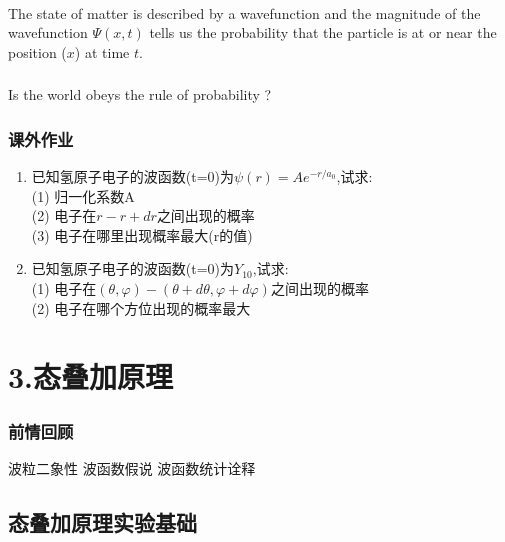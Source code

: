 \begin{frame}  
    \begin{tcolorbox3}[Conclusion]
        ~~\\
       {The state of matter is described by a wavefunction and the magnitude of the wavefunction $ \Psi(x,t)$ 
       tells us the probability that the particle is at or near the position ($x$) at time $t$.}
    \end{tcolorbox3} 
\end{frame} 

\begin{frame}
    \frametitle{}
    \centering
    {
    {Is the world obeys the rule of probability ?}
    }
\end{frame}
 \begin{frame}
     \frametitle{课外作业}
     \begin{enumerate}
        \item 已知氢原子电子的波函数(t=0)为$\psi(r)=Ae^{-r/a_0} $,试求:\\
               (1) 归一化系数A \\
               (2) 电子在$r-r+dr$之间出现的概率\\
               (3) 电子在哪里出现概率最大(r的值) 
        \item 已知氢原子电子的波函数(t=0)为$ Y_{10} $,试求:\\
                (1) 电子在$(\theta, \varphi) -(\theta + d \theta, \varphi + d \varphi)$之间出现的概率\\
                (2) 电子在哪个方位出现的概率最大 
     \end{enumerate}
 \end{frame}

 \section{3.态叠加原理}

 \begin{frame}
     \frametitle{前情回顾}
     \begin{itemize}
         \Item 波粒二象性
         \Item 波函数假说
         \Item 波函数统计诠释
     \end{itemize}
 \end{frame}  
 
 \subsection{态叠加原理实验基础}
 
